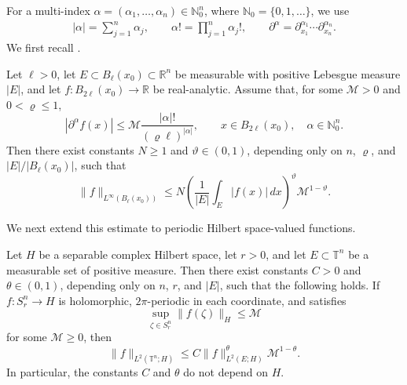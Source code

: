 \documentclass[print,wide]{draft}
\begin{document}
For a multi-index $\alpha=(\alpha_1,\ldots,\alpha_n)\in\mathbb N_0^n$,
where $\mathbb N_0=\{0,1,\ldots\}$, we use
\begin{align*}
|\alpha|=\sum_{j=1}^n\alpha_j,\qquad
\alpha!=\prod_{j=1}^n\alpha_j!,\qquad
\partial^\alpha=\partial_{x_1}^{\alpha_1}\cdots\partial_{x_n}^{\alpha_n}.
\end{align*}
%
We first recall \cite[Theorem~4]{Apraiz2014}.
%
\begin{lemma}
\label{thm:scalar-propagation}
Let \(\ell>0\), let \(E\subset B_\ell(x_0)\subset\mathbb R^n\) be measurable with positive Lebesgue measure \(|E|\), and let \(f:B_{2\ell}(x_0)\to\mathbb R\) be real-analytic. Assume that, for some \(\mathcal M>0\) and \(0<\varrho\le1\),
\[
|\partial^\alpha f(x)|
\le \mathcal M\frac{|\alpha|!}{(\varrho\ell)^{|\alpha|}},
\qquad x\in B_{2\ell}(x_0),\quad \alpha\in\mathbb N_0^n.
\]
Then there exist constants \(N\ge1\) and \(\vartheta\in(0,1)\), depending only on \(n\), \(\varrho\), and \(|E|/|B_\ell(x_0)|\), such that
\[
\|f\|_{L^\infty(B_\ell(x_0))}
\le N
\left(\frac1{|E|}\int_E|f(x)|\,dx\right)^\vartheta
\mathcal M^{1-\vartheta}.
\]
\end{lemma}
%


We next extend this estimate to periodic Hilbert space-valued functions.

\begin{proposition}
\label{prop:hilbert-propagation}
Let \(H\) be a separable complex Hilbert space, let \(r>0\), and let \(E\subset\mathbb T^n\) be a measurable set of positive measure. Then there exist constants \(C>0\) and \(\theta\in(0,1)\), depending only on \(n\), \(r\), and \(|E|\), such that the following holds. If \(f:S_r^n\to H\) is holomorphic, \(2\pi\)-periodic in each coordinate, and satisfies
\[
\sup_{\zeta\in S_r^n}\|f(\zeta)\|_H\le\mathcal M
\]
for some \(\mathcal M\ge0\), then
\begin{equation}\label{eq:hilbert-propagation}
\|f\|_{L^2(\mathbb T^n;H)}
\le C
\|f\|_{L^2(E;H)}^\theta
\mathcal M^{1-\theta}.
\end{equation}
In particular, the constants \(C\) and \(\theta\) do not depend on \(H\).
\end{proposition}
%
\end{document}
